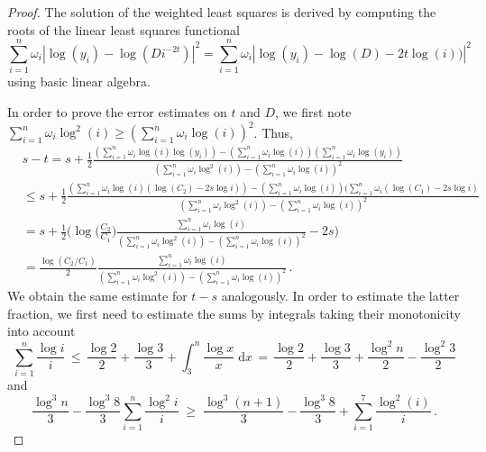 \documentclass[10pt,a4paper]{amsart}
\begin{document}
\begin{proof} The solution of the weighted least squares is derived by computing the roots of the linear least squares functional
    \begin{equation*}
        \sum_{i=1}^{n} \omega_i | \log(y_i) - \log(D i^{-2t})|^2
        = \sum_{i=1}^{n} \omega_i | \log(y_i) - \log(D) -2t\log(i))|^2
    \end{equation*}
    using basic linear algebra.
    
    In order to prove the error estimates on $t$ and $D$, we first note
    $\sum_{i=1}^{n}\omega_i\log^2(i) \ge (\sum_{i=1}^{n}\omega_i\log(i))^2$.
    Thus,
    \begin{align}
        &s-t
        = s + \frac 12 \frac{(\sum_{i=1}^{n}\omega_i \log(i) \log(y_i)) - (\sum_{i=1}^{n} \omega_i \log(i))(\sum_{i=1}^{n} \omega_i \log(y_i))}{(\sum_{i=1}^{n}\omega_i \log^2(i)) - (\sum_{i=1}^{n}\omega_i \log(i))^2}\nonumber \\
        &\le s + \frac 12 \frac{(\sum_{i=1}^{n}\omega_i \log(i) ( \log(C_2) - 2s\log i )) - (\sum_{i=1}^{n} \omega_i \log(i))(\sum_{i=1}^{n} \omega_i (\log(C_1) - 2s\log i)}{(\sum_{i=1}^{n}\omega_i \log^2(i)) - (\sum_{i=1}^{n}\omega_i \log(i))^2}\nonumber \\
        &= s + \frac 12
        \Big(
        \log\Big(\frac{C_2}{C_1}\Big)\frac{\sum_{i=1}^{n}\omega_i \log(i)}{(\sum_{i=1}^{n}\omega_i \log^2(i)) - (\sum_{i=1}^{n}\omega_i \log(i))^2}
        -2s\Big)\nonumber \\
        &= \frac{\log(C_2/C_1)}{2}
        \frac{\sum_{i=1}^{n}\omega_i \log(i)}{(\sum_{i=1}^{n}\omega_i \log^2(i)) - (\sum_{i=1}^{n}\omega_i \log(i))^2}\label{eq:alligatoah} \,.
    \end{align}
    We obtain the same estimate for $t-s$ analogously.
    In order to estimate the latter fraction, we first need to estimate the sums by integrals taking their monotonicity into account
    \begin{equation}\label{eq:overkill1}
        \sum_{i=1}^{n} \frac{\log i}{i}
        \,\le\, \frac{\log 2}{2} + \frac{\log 3}{3} + \int_{3}^{n}\frac{\log x}{x}\;\mathrm dx
        \,=\, \frac{\log 2}{2} + \frac{\log 3}{3} + \frac{\log^2 n}{2} - \frac{\log^2 3}{2}
    \end{equation}
    and
    \begin{equation}\label{eq:overkill2}
        \frac{\log^3 n}{3} - \frac{\log^3 8}{3}
\sum_{i=1}^{n} \frac{\log^2 i}{i}
        \;\ge\;
        \frac{\log^3 (n+1)}{3} - \frac{\log^3 8}{3}
        + \sum_{i=1}^{7}\frac{\log^2 (i)}{i} \,.

\end{equation}
\end{proof}
\end{document}
